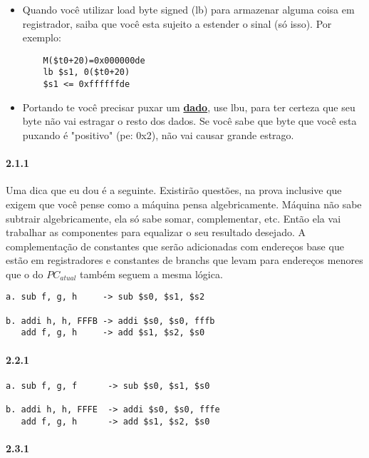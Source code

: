 \documentclass{article}
\begin{document}
\begin{itemize}
\item Quando você utilizar load byte signed (lb) para armazenar alguma coisa em 
registrador, saiba que você esta sujeito a estender o sinal (só isso). Por 
exemplo:

  \begin{verbatim}
    M($t0+20)=0x000000de
    lb $s1, 0($t0+20)
    $s1 <= 0xffffffde
  \end{verbatim}

\item Portando te você precisar puxar um \textbf{\color{Red} \underline{dado}}, 
use lbu, para ter certeza que seu byte não vai estragar o resto dos dados. Se 
você sabe que byte que você esta puxando é "positivo" (pe: 0x2), não vai causar 
grande estrago.

\end{itemize}

\paragraph{2.1.1}

Uma dica que eu dou é a seguinte. Existirão questões, na prova inclusive que
exigem que você pense como a máquina pensa algebricamente. Máquina não sabe
subtrair algebricamente, ela só sabe somar, complementar, etc. Então ela vai
trabalhar as componentes para equalizar o seu resultado desejado. A
complementação de constantes que serão adicionadas com endereços base que estão
em registradores e constantes de branchs que levam para endereços menores que o
do $PC_{atual}$ também seguem a mesma lógica.

\begin{verbatim}
a. sub f, g, h     -> sub $s0, $s1, $s2

b. addi h, h, FFFB -> addi $s0, $s0, fffb
   add f, g, h     -> add $s1, $s2, $s0
\end{verbatim}


\paragraph{2.2.1}

\begin{verbatim}
a. sub f, g, f      -> sub $s0, $s1, $s0

b. addi h, h, FFFE  -> addi $s0, $s0, fffe
   add f, g, h      -> add $s1, $s2, $s0
\end{verbatim}

\paragraph{2.3.1}
\end{document}
